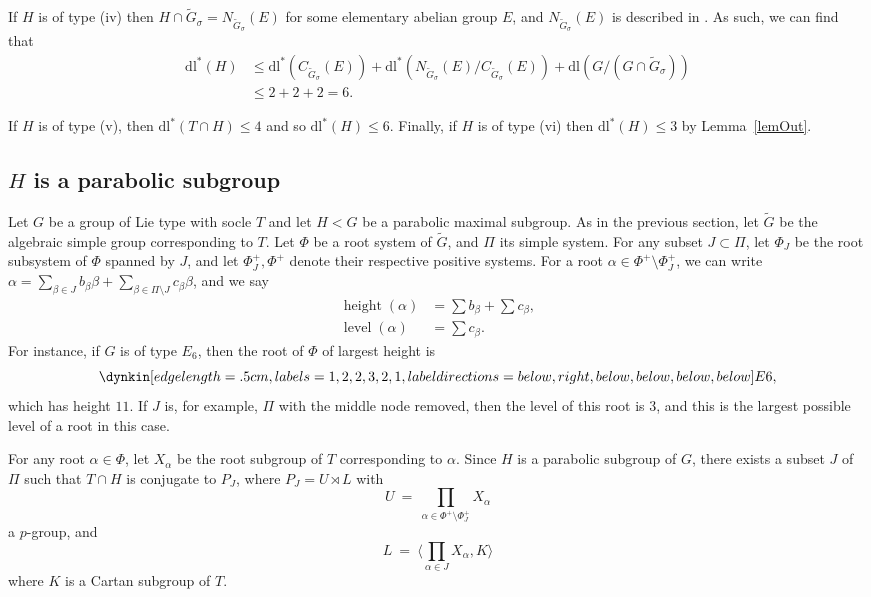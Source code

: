 \documentclass[11pt]{amsart}
\numberwithin{equation}{section}
\theoremstyle{definition}
\theoremstyle{remark}
\newcommand{\dll}{\mathrm{dl^*}}
\newcommand{\dl}{\mathrm{dl}}
\begin{document}
If $H$ is of type (iv) then $H \cap \widetilde G_\sigma = N_{\widetilde G_\sigma}(E)$ for some elementary abelian group $E$, and $N_{\widetilde G_\sigma}(E)$ is described in \cite[Tab.~1]{CLSS92}. As such, we can find that
\begin{align*}
    \dll(H) & \leq
    \dll(C_{\widetilde G _\sigma}(E)) + \dll(N_{\widetilde G_\sigma}(E)/C_{\widetilde G_\sigma}(E)) + \dl(G/(G \cap \widetilde G_\sigma)) \\
    & \leq 2 + 2 + 2 = 6.
\end{align*}

If $H$ is of type (v), then $\dll(T \cap H) \leq 4$ and so $\dll(H) \leq 6$.
Finally, if $H$ is of type (vi) then $\dll(H) \leq 3$ by Lemma~\ref{lemOut}.








\subsection{$H$ is a parabolic subgroup} \label{sec3.4}

Let $G$ be a group of Lie type with socle $T$ and let $H<G$ be a parabolic maximal subgroup.
As in the previous section, let $\widetilde G$ be the algebraic simple group corresponding to $T$. Let $\Phi$ be a root system of $\widetilde G$, and $\Pi$ its simple system. For any subset $J \subset \Pi$, let $\Phi_J$ be the root subsystem of $\Phi$ spanned by $J$, and let $\Phi_J^+, \Phi^+$ denote their respective positive systems. For a root $\alpha \in \Phi^+ \setminus \Phi_J^+$, we can write $\alpha = \sum_{\beta \in J} b_\beta \beta + \sum_{\beta \in \Pi \setminus J} c_\beta \beta$, and we say
\begin{align*}
    \operatorname{height}(\alpha) & = \sum b_\beta + \sum c_\beta , \\
    \operatorname{level}(\alpha) & = \sum c_\beta .
\end{align*} 
For instance, if $G$ is of type $E_6$, then the root of $\Phi$ of largest height is
\[
    \dynkin[edge length=.5cm, labels={1, 2, 2, 3, 2, 1}, label directions={below,right,below,below,below,below}] E{6},
\]
which has height $11$. If $J$ is, for example, $\Pi$ with the middle node removed, then the level of this root is $3$, and this is the largest possible level of a root in this case.

For any root $\alpha \in \Phi$, let $X_\alpha$ be the root subgroup of $T$ corresponding to $\alpha$.
Since $H$ is a parabolic subgroup of $G$, there exists a subset $J$ of $\Pi$ such that $T \cap H$ is conjugate to $P_J$, where $P_J = U \rtimes L$ with 
\[
    U \> = \> \prod_{\alpha \in \Phi^+ \setminus \Phi_J^+} X_\alpha
\]
a $p$-group, and
\[
    L \> = \> \langle \prod_{\alpha \in J} X_\alpha, K \rangle 
\]
where $K$ is a Cartan subgroup of $T$.
\end{document}
